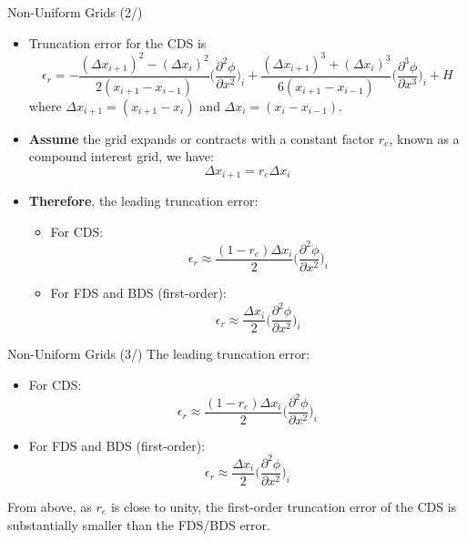 \begin{frame}{Non-Uniform Grids (2/)}
\begin{itemize}
    \item Truncation error for the CDS is     
    \[
    \epsilon_{r} = 
    - \frac{(\Delta x_{i+1})^{2} - (\Delta x_{i})^{2}}{2(x_{i+1}-x_{i-1})}\bigg(\frac{\partial^{2} \phi}{\partial x^{2}}\bigg)_{i} + \frac{(\Delta x_{i+1})^{3} + (\Delta x_{i})^{3}}{6(x_{i+1}-x_{i-1})}\bigg(\frac{\partial^{3} \phi}{\partial x^{3}}\bigg)_{i} + H
    \]
    where $\Delta x_{i+1} = (x_{i+1}-x_{i})$ and $\Delta x_{i} = (x_{i}-x_{i-1})$. 
    
    \item \textbf{Assume} the grid expands or contracts with a constant factor $r_{e}$, known as a compound interest grid, we have: \[\Delta x_{i+1} = r_{e}\Delta x_{i}\]
    
    \item \textbf{Therefore}, the leading truncation error:
    \begin{itemize}
        \item For CDS: 
        \[
        \epsilon_{r} \approx
        \frac{(1-r_{e})\Delta x_{i}}{2}\bigg(\frac{\partial^{2}\phi}{\partial x^{2}}\bigg)_{i}
        \]
        \item For FDS and BDS (first-order):
        \[
        \epsilon_{r} \approx
        \frac{\Delta x_{i}}{2}\bigg(\frac{\partial^{2}\phi}{\partial x^{2}}\bigg)_{i}
        \]
    \end{itemize}
\end{itemize}
\end{frame}
\begin{frame}{Non-Uniform Grids (3/)}
 The leading truncation error:
    \begin{itemize}
        \item For CDS: 
        \[
        \epsilon_{r} \approx
        \frac{(1-r_{e})\Delta x_{i}}{2}\bigg(\frac{\partial^{2}\phi}{\partial x^{2}}\bigg)_{i}
        \]
        \item For FDS and BDS (first-order):
        \[
        \epsilon_{r} \approx
        \frac{\Delta x_{i}}{2}\bigg(\frac{\partial^{2}\phi}{\partial x^{2}}\bigg)_{i}
        \]
    \end{itemize}
From above, as $r_{e}$ is close to unity, the first-order truncation error of the CDS is substantially smaller than the FDS/BDS error.
\end{frame}
